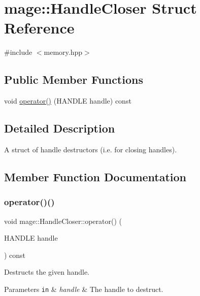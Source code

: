 \hypertarget{structmage_1_1_handle_closer}{}\section{mage\+:\+:Handle\+Closer Struct Reference}
\label{structmage_1_1_handle_closer}


{\ttfamily \#include $<$memory.\+hpp$>$}

\subsection*{Public Member Functions}
\begin{DoxyCompactItemize}
\item 
void \hyperlink{structmage_1_1_handle_closer_a75dce6ac026a25d1ad73b87170d7183b}{operator()} (H\+A\+N\+D\+LE handle) const
\end{DoxyCompactItemize}


\subsection{Detailed Description}
A struct of handle destructors (i.\+e. for closing handles). 

\subsection{Member Function Documentation}
\hypertarget{structmage_1_1_handle_closer_a75dce6ac026a25d1ad73b87170d7183b}{}\label{structmage_1_1_handle_closer_a75dce6ac026a25d1ad73b87170d7183b} 
\subsubsection{\texorpdfstring{operator()()}{operator()()}}
{\footnotesize\ttfamily void mage\+::\+Handle\+Closer\+::operator() (\begin{DoxyParamCaption}\item[{H\+A\+N\+D\+LE}]{handle }\end{DoxyParamCaption}) const}

Destructs the given handle.


\begin{DoxyParams}[1]{Parameters}
\mbox{\tt in}  & {\em handle} & The handle to destruct. \\
\hline
\end{DoxyParams}
